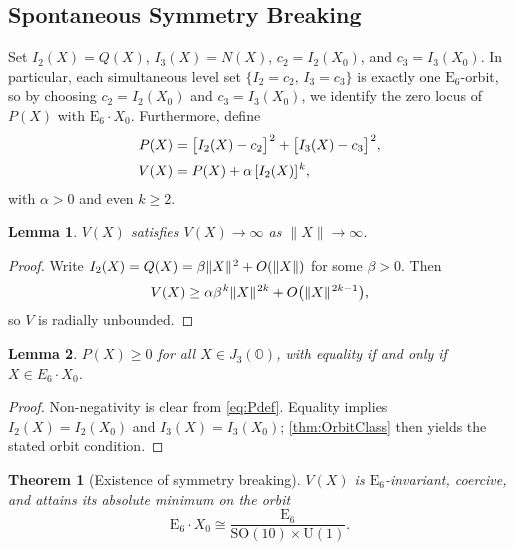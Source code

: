 \documentclass[pdflatex,sn-mathphys-num]{sn-jnl}
\theoremstyle{thmstyleone}
\newtheorem{theorem}{Theorem}
\newtheorem{lemma}{Lemma}
\theoremstyle{thmstyletwo}%
\theoremstyle{thmstylethree}%
\newcommand{\SO}[1]{\mathrm{SO(#1)}}
\newcommand{\U}[1]{\mathrm{U(#1)}}
\newcommand{\E}[1]{\mathrm{E_{#1}}}
\newcommand{\jalg}{J_3(\mathbb{O})}
\newcommand{\SOTen}{\SO{10}}
\newcommand{\UOne}{\U{1}}
\newcommand{\ESix}{\E{6}}
\newcommand{\SOTenXUOne}{\SOTen \times \UOne}
\newcommand{\sm}{\hspace{.065em}}
\newcommand{\smexp}[1]{^{\sm #1}}
\begin{document}
\subsection{Spontaneous Symmetry Breaking}\label{subsec:PolyPot}
Set $I_{2}(X)=Q(X)$, $I_{3}(X)=N(X)$, $c_{2}=I_{2}(X_{0})$, and $c_{3}=I_{3}(X_{0})$.
In particular, each simultaneous level set $\{I_{2}=c_{2},\,I_{3}=c_{3}\}$ is
exactly one $\ESix$-orbit, so by choosing $c_{2}=I_{2}(X_{0})$ and $c_{3}=I_{3}(X_{0})$,
we identify the zero locus of $P(X)$ with $\ESix \cdot X_{0}$.
Furthermore, define
\begin{equation}\label{eq:Pdef}
\begin{aligned}
  P(X)
  &=\bigl[I_{2}(X)-c_{2}\bigr]\smexp{2}
  +\bigl[I_{3}(X)-c_{3}\bigr]\smexp{2},\\[2pt]
  V(X)
  &=P(X)
  +\alpha\,[I_{2}(X)]\smexp{k},
\end{aligned}
\end{equation}
with $\alpha>0$ and even $k\ge2$.

\begin{lemma}\label{lem:A-coercive}
$V(X)$ satisfies $V(X)\to\infty$ as $\|X\|\to\infty$.
\end{lemma}

\begin{proof}
Write $I_{2}(X)=Q(X)=\beta\|X\|\smexp{2}+O(\|X\|)$ for some $\beta>0$.  
Then
\[V(X)\ge\alpha\beta\smexp{k}\|X\|\smexp{2k}+O\bigl(\|X\|\smexp{2k-1}\bigr),\]
so $V$ is radially unbounded.
\end{proof}

\begin{lemma}\label{lem:A-sumsq}
$P(X)\ge0$ for all $X\in\jalg$, with equality if and only if $X\in E_{6} \cdot X_{0}$.
\end{lemma}

\begin{proof}
Non-negativity is clear from \eqref{eq:Pdef}.
Equality implies $I_{2}(X)=I_{2}(X_{0})$ and $I_{3}(X)=I_{3}(X_{0})$;
\autoref{thm:OrbitClass} then yields the stated orbit condition.
\end{proof}

\begin{theorem}[Existence of symmetry breaking]\label{thm:Breaking}
$V(X)$ is $\ESix$-invariant, coercive, and attains its absolute minimum on the orbit
\[
  \ESix\cdot X_{0}
  \cong
  \frac{\ESix}{\SOTenXUOne}.
\]
\end{theorem}
\end{document}
